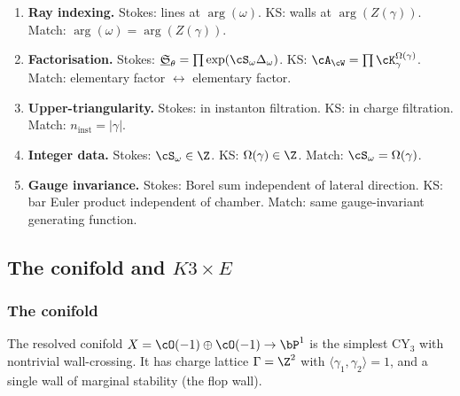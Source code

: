 \begin{enumerate}[label=\textup{(\arabic*)}]
 \item \textbf{Ray indexing.} Stokes: lines at $\arg(\omega)$. KS: walls at $\arg(Z(\gamma))$. Match: $\arg(\omega) = \arg(Z(\gamma))$.
 \item \textbf{Factorisation.} Stokes: $\underline{\mathfrak{S}}_\theta = \prod \exp(\cS_\omega \Delta_\omega)$. KS: $\cA_\cW = \prod \cK_\gamma^{\Omega(\gamma)}$. Match: elementary factor $\leftrightarrow$ elementary factor.
 \item \textbf{Upper-triangularity.} Stokes: in instanton filtration. KS: in charge filtration. Match: $n_{\mathrm{inst}} = |\gamma|$.
 \item \textbf{Integer data.} Stokes: $\cS_\omega \in \Z$. KS: $\Omega(\gamma) \in \Z$. Match: $\cS_\omega = \Omega(\gamma)$.
 \item \textbf{Gauge invariance.} Stokes: Borel sum independent of lateral direction. KS: bar Euler product independent of chamber. Match: same gauge-invariant generating function.
\end{enumerate}

\subsection{The conifold and \texorpdfstring{$K3 \times E$}{K3 x E}}
\label{subsec:verified-cases}

\subsubsection{The conifold}
\label{subsubsec:conifold-verification}
%

The resolved conifold $X = \cO(-1) \oplus \cO(-1) \to \bP^1$ is the simplest CY$_3$ with nontrivial wall-crossing. It has charge lattice $\Gamma = \Z^2$ with $\langle \gamma_1, \gamma_2 \rangle = 1$, and a single wall of marginal stability (the flop wall).

